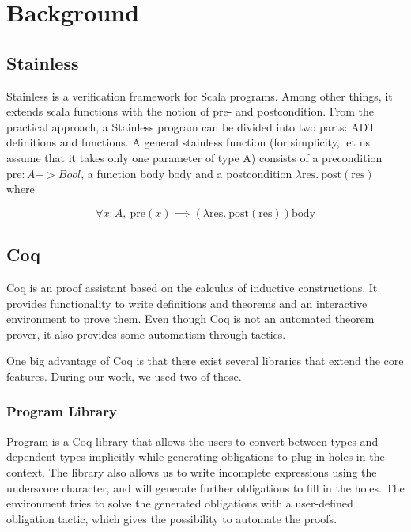 \section{Background}

\subsection{Stainless}

Stainless is a verification framework for Scala programs. Among other things, it extends scala functions with the notion of pre- and postcondition. From the practical approach, a Stainless program can be divided into two parts: ADT definitions and functions. A general stainless function (for simplicity, let us assume that it takes only one parameter of type A) consists of a precondition $\text{pre}: A -> Bool$, a function body $\text{body}$ and a postcondition $\lambda  \text{res}. ~\text{post}( \text{res})$ where 

$$\forall x : A, ~ \text{pre}(x) \implies (\lambda  \text{res}. ~\text{post}( \text{res})) \text{body}$$

\subsection{Coq}

Coq is an proof assistant based on the calculus of inductive constructions. It provides functionality to write definitions and theorems and an interactive environment to prove them. Even though Coq is not an automated theorem prover, it also provides some automatism through tactics.

One big advantage of Coq is that there exist several libraries that extend the core features. During our work, we used two of those.

\subsubsection{Program Library}

Program is a Coq library that allows the users to convert between types and dependent types implicitly while generating obligations to plug in holes in the context. The library also allows us to write incomplete expressions using the underscore character, and will generate further obligations to fill in the holes. The environment tries to solve the generated obligations with a user-defined obligation tactic, which gives the possibility to automate the proofs.


